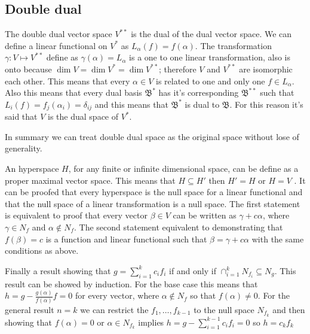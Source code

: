 \documentclass[../main.tex]{subfiles}
\begin{document}
\subsection{Double dual}
The double dual vector space $V^{**}$ is the dual of the dual vector space. We can define a linear functional on $V^*$ as $L_\alpha(f)=f(\alpha)$. The transformation $\gamma:V\mapsto V^{**}$ define as $\gamma(\alpha)=L_\alpha$ is a one to one linear transformation, also is onto because $\dim V = \dim V^* = \dim V^{**}$; therefore $V$ and $V^{**}$ are isomorphic each other. This means that every $\alpha\in V$ is related to one and only one $f\in L_\alpha$. Also this means that every dual basis $\mathfrak{B}^*$ has it's corresponding $\mathfrak{B}^{**}$ such that $L_i(f)=f_j(\alpha_i)=\delta_{ij}$ and this means that $\mathfrak{B}^*$ is dual to $\mathfrak{B}$. For this reason it's said that $V$ is the dual space of $V^*$.

In summary we can treat double dual space as the original space without lose of generality.

An hyperspace $H$, for any finite or infinite dimensional space, can be define as a proper maximal vector space. This means that $H\subseteq H'$ then $H'=H$ or $H=V$ . It can be proofed that every hyperspace is the null space for a linear functional and that the null space of a linear transformation is a null space. The first statement is equivalent to proof that every vector $\beta\in V$ can be written as $\gamma + c\alpha$, where $\gamma\in N_f$ and $\alpha\not\in N_f$. The second statement equivalent to demonstrating that $f(\beta)=c$ is a function and linear functional such that $\beta = \gamma + c\alpha$ with the same conditions as above.

Finally a result showing that $g=\sum_{i=1}^k c_i f_i$ if and only if $\cap_{i=1}^k N_{f_i} \subseteq N_g$. This result can be showed by induction. For the base case this means that $h=g-\frac{g(\alpha)}{f(\alpha)}f=0$  for every vector, where $\alpha\notin N_f$ so that $f(\alpha)\neq 0$. For the general result $n=k$ we can restrict the $f_1,\dots,f_{k-1}$ to the null space $N_{f_k}$ and then showing that $f(\alpha)=0$ or $\alpha\in N_{f_k}$ implies $h=g-\sum_{i=1}^{k-1} c_i f_i = 0$ so $h = c_k f_k$
\end{document}
